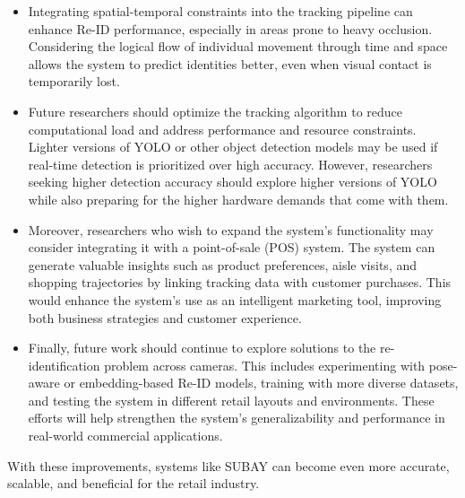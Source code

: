 {\begin{itemize}
	\item Integrating spatial-temporal constraints into the tracking pipeline can enhance Re-ID performance, especially in areas prone to heavy occlusion. Considering the logical flow of individual movement through time and space allows the system to predict identities better, even when visual contact is temporarily lost.
	
	\item Future researchers should optimize the tracking algorithm to reduce computational load and address performance and resource constraints. Lighter versions of YOLO or other object detection models may be used if real-time detection is prioritized over high accuracy. However, researchers seeking higher detection accuracy should explore higher versions of YOLO while also preparing for the higher hardware demands that come with them.
	
	\item Moreover, researchers who wish to expand the system's functionality may consider integrating it with a point-of-sale (POS) system. The system can generate valuable insights such as product preferences, aisle visits, and shopping trajectories by linking tracking data with customer purchases. This would enhance the system's use as an intelligent marketing tool, improving both business strategies and customer experience.
	
	\item Finally, future work should continue to explore solutions to the re-identification problem across cameras. This includes experimenting with pose-aware or embedding-based Re-ID models, training with more diverse datasets, and testing the system in different retail layouts and environments. These efforts will help strengthen the system’s generalizability and performance in real-world commercial applications.
\end{itemize}

With these improvements, systems like SUBAY can become even more accurate, scalable, and beneficial for the retail industry.


}
